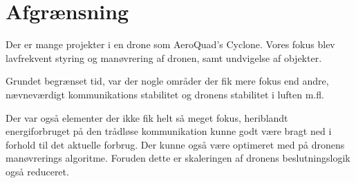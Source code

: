 \documentclass[Main]{subfiles}
\begin{document}
\section{Afgrænsning}
Der er mange projekter i en drone som AeroQuad's Cyclone. 
Vores fokus blev lavfrekvent styring og manøvrering af dronen, samt  undvigelse af objekter. 


Grundet begrænset tid, var der nogle områder der fik mere fokus end andre, nævneværdigt kommunikations stabilitet og dronens stabilitet i luften  m.fl. 

Der var også elementer der ikke fik helt så meget fokus, heriblandt energiforbruget på den trådløse kommunikation kunne godt være bragt ned i forhold til det aktuelle forbrug. 
Der kunne også være optimeret med på dronens manøvrerings algoritme.
Foruden dette er skaleringen af dronens beslutningslogik også reduceret.
\end{document}
